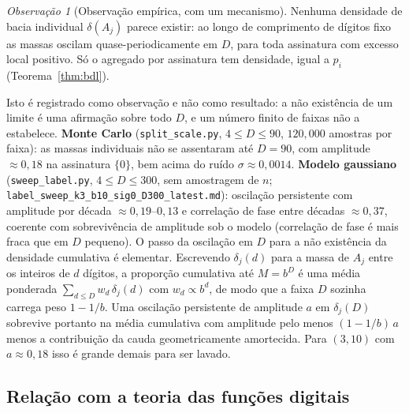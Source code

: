 \documentclass[11pt]{article}
\theoremstyle{definition}
\theoremstyle{remark}
\newtheorem{remark}[theorem]{Observação}
\begin{document}
\begin{remark}[Observação empírica, com um mecanismo]\label{rem:result}
Nenhuma densidade de bacia individual $\delta(A_j)$ parece existir: ao longo de comprimento de dígitos fixo as massas oscilam quase-periodicamente em $D$, para toda assinatura com excesso local positivo. Só o agregado por assinatura tem densidade, igual a $p_i$ (Teorema~\ref{thm:bdl}).

Isto é registrado como observação e não como resultado: a não existência de um limite é uma afirmação sobre todo $D$, e um número finito de faixas não a estabelece. \textbf{Monte Carlo} (\texttt{split\_scale.py}, $4 \le D \le 90$, $120{,}000$ amostras por faixa): as massas individuais não se assentaram até $D=90$, com amplitude $\approx 0{,}18$ na assinatura $\{0\}$, bem acima do ruído $\sigma \approx 0{,}0014$. \textbf{Modelo gaussiano} (\texttt{sweep\_label.py}, $4 \le D \le 300$, sem amostragem de $n$; \texttt{label\_sweep\_k3\_b10\_sig0\_D300\_latest.md}): oscilação persistente com amplitude por década $\approx 0{,}19$--$0{,}13$ e correlação de fase entre décadas $\approx 0{,}37$, coerente com sobrevivência de amplitude sob o modelo (correlação de fase é mais fraca que em $D$ pequeno). O passo da oscilação em $D$ para a não existência da densidade cumulativa é elementar. Escrevendo $\delta_j(d)$ para a massa de $A_j$ entre os inteiros de $d$ dígitos, a proporção cumulativa até $M = b^D$ é uma média ponderada $\sum_{d \le D} w_d \, \delta_j(d)$ com $w_d \propto b^{d}$, de modo que a faixa $D$ sozinha carrega peso $1 - 1/b$. Uma oscilação persistente de amplitude $a$ em $\delta_j(D)$ sobrevive portanto na média cumulativa com amplitude pelo menos $(1-1/b)\,a$ menos a contribuição da cauda geometricamente amortecida. Para $(3,10)$ com $a \approx 0{,}18$ isso é grande demais para ser lavado.
\end{remark}

\subsection{Relação com a teoria das funções digitais}
\end{document}
